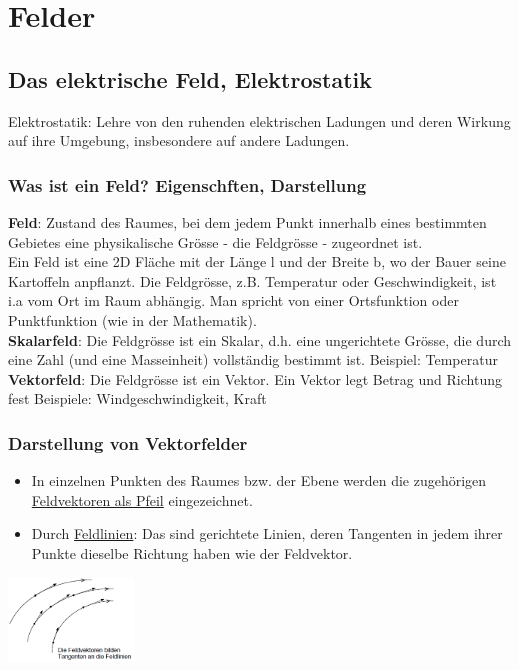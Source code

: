 \section{Felder}
\subsection{Das elektrische Feld, Elektrostatik}
Elektrostatik: Lehre von den ruhenden elektrischen Ladungen und deren Wirkung auf ihre Umgebung, insbesondere auf andere Ladungen.\\
\subsubsection{Was ist ein Feld? Eigenschften, Darstellung}
\textbf{Feld}: Zustand des Raumes, bei dem jedem Punkt innerhalb eines bestimmten Gebietes eine physikalische Grösse - die Feldgrösse - zugeordnet ist.\\
Ein Feld ist eine 2D Fläche mit der Länge l und der Breite b, wo der Bauer seine Kartoffeln anpflanzt.
Die Feldgrösse, z.B. Temperatur oder Geschwindigkeit, ist i.a vom Ort im Raum abhängig. Man spricht von einer Ortsfunktion oder Punktfunktion (wie in der Mathematik).\\
\textbf{Skalarfeld}: Die Feldgrösse ist ein Skalar, d.h. eine ungerichtete Grösse, die durch eine Zahl (und eine Masseinheit) vollständig bestimmt ist. Beispiel: Temperatur\\
\textbf{Vektorfeld}: Die Feldgrösse ist ein Vektor. Ein Vektor legt Betrag und Richtung fest Beispiele: Windgeschwindigkeit, Kraft\\

\subsubsection{Darstellung von Vektorfelder}
\begin{multicols}{2}
\begin{itemize}
	\item In einzelnen Punkten des Raumes bzw. der Ebene werden die zugehörigen
	\underline{Feldvektoren als Pfeil} eingezeichnet.
	\item Durch \underline{Feldlinien}: Das sind gerichtete Linien, deren Tangenten in jedem ihrer Punkte dieselbe Richtung haben wie der Feldvektor.\\
\end{itemize}
\includegraphics[width=0.25\textwidth]{pics/felder/Feldvektoren}
\end{multicols}
\newpage
